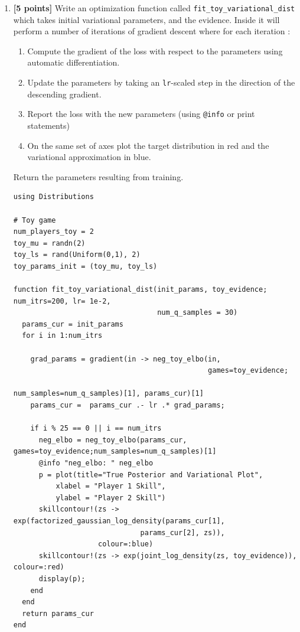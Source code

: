 \documentclass{article}
\begin{document}
\begin{enumerate}[label=(\alph*)]
  \item {\bf [5 points]} Write an optimization function called \texttt{fit\_toy\_variational\_dist}
    which takes initial variational parameters, and the evidence.
    Inside it will perform a number of iterations of gradient descent where for each iteration :
    \begin{enumerate}
      \item Compute the gradient of the loss with respect to the parameters using automatic differentiation.
      \item Update the parameters by taking an \texttt{lr}-scaled step in the direction of the descending gradient.
      \item Report the loss with the new parameters (using \texttt{@info} or print statements)
      \item On the same set of axes plot the target distribution in red and the variational approximation in blue.
    \end{enumerate}
    Return the parameters resulting from training.

\begin{verbatim}
using Distributions

# Toy game
num_players_toy = 2
toy_mu = randn(2)
toy_ls = rand(Uniform(0,1), 2)
toy_params_init = (toy_mu, toy_ls)

function fit_toy_variational_dist(init_params, toy_evidence; num_itrs=200, lr= 1e-2,
                                  num_q_samples = 30)
  params_cur = init_params
  for i in 1:num_itrs

    grad_params = gradient(in -> neg_toy_elbo(in, 
                                              games=toy_evidence;
                                              num_samples=num_q_samples)[1], params_cur)[1]
    params_cur =  params_cur .- lr .* grad_params;

    if i % 25 == 0 || i == num_itrs
      neg_elbo = neg_toy_elbo(params_cur, games=toy_evidence;num_samples=num_q_samples)[1]
      @info "neg_elbo: " neg_elbo
      p = plot(title="True Posterior and Variational Plot",
          xlabel = "Player 1 Skill",
          ylabel = "Player 2 Skill")
      skillcontour!(zs -> exp(factorized_gaussian_log_density(params_cur[1], 
                              params_cur[2], zs)),
                    colour=:blue)
      skillcontour!(zs -> exp(joint_log_density(zs, toy_evidence)), colour=:red)
      display(p);
    end
  end
  return params_cur
end
\end{verbatim}


\end{enumerate}
\end{document}
